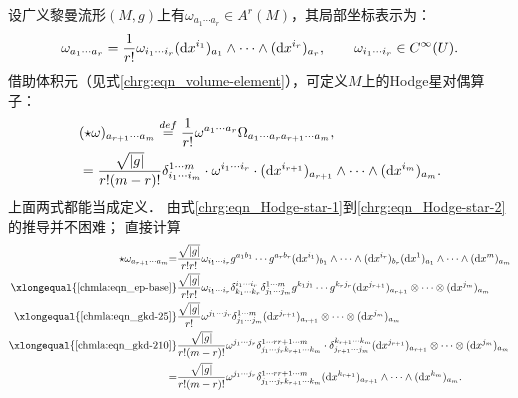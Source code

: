 设广义黎曼流形$(M,g)$上有$\omega_{a_1 \cdots a_r}\in A^r(M)$，其局部坐标表示为：
\begin{equation}
    \omega_{a_1 \cdots a_r}= \frac{1}{r!}\omega_{i_1\cdots i_r} ({\rm d}x^{i_1})_{a_1} \wedge \cdots
      \wedge({\rm d}x^{i_r})_{a_r}, \qquad \omega_{i_1\cdots i_r} \in C^\infty(U) .
\end{equation}
借助体积元（见式\eqref{chrg:eqn_volume-element}），可定义$M$上的Hodge星对偶算子：
\begin{subequations}\label{chrg:eqn_Hodge-star}
\begin{align}
    &(\star \omega) _{ a_{r+1}  \cdots a_m} \overset{def}{=} 
    \frac{1}{r!} \omega^{a_1 \cdots a_r} \Omega_{a_1 \cdots a_r a_{r+1} \cdots a_m},
      \label{chrg:eqn_Hodge-star-1} \\
    &= \frac{\sqrt{|g|}}{r! (m-r)!} \delta_{i_{1} \cdots i_m}^{1 \cdots m}
      \cdot \omega^{i_1\cdots i_r}\cdot   ({\rm d}x^{i_{r+1}})_{a_{r+1}} \wedge
     \cdots \wedge({\rm d}x^{i_m})_{a_m} . \label{chrg:eqn_Hodge-star-2}
\end{align}
\end{subequations}
上面两式都能当成定义．
由式\eqref{chrg:eqn_Hodge-star-1}到\eqref{chrg:eqn_Hodge-star-2}的推导并不困难；
直接计算
\begin{align*}
    \star \omega _{a_{r+1} \cdots a_m} {=}  &
    \frac{\sqrt{|g|}}{r! r!} \omega_{i_1\cdots i_r} g^{a_1 b_1}\cdots g^{a_r b_r}
    ({\rm d}x^{i_1})_{b_1} \wedge \cdots \wedge({\rm d}x^{i_r})_{b_r}
    ({\rm d}x^1)_{a_1} \wedge \cdots \wedge({\rm d}x^m)_{a_m} \\
    \xlongequal{\ref{chmla:eqn_ep-base}}& \frac{\sqrt{|g|}}{r! r!} \omega_{i_1\cdots i_r}
    \delta^{i_1 \cdots i_r}_{k_1 \cdots k_r}  \delta_{j_1 \cdots j_m}^{1 \cdots m}
     g^{k_1 j_1}\cdots g^{k_r j_r}
     ({\rm d}x^{j_{r+1}})_{a_{r+1}} \otimes \cdots \otimes ({\rm d}x^{j_m})_{a_m}  \\
     \xlongequal{\ref{chmla:eqn_gkd-25}}& \frac{\sqrt{|g|}}{r!} \omega^{j_1\cdots j_r}
      \delta_{j_1 \cdots j_m}^{1 \cdots m}
     ({\rm d}x^{j_{r+1}})_{a_{r+1}} \otimes \cdots \otimes ({\rm d}x^{j_m})_{a_m}  \\
     \xlongequal{\ref{chmla:eqn_gkd-210}}&
     \frac{\sqrt{|g|}}{r! (m-r)!} \omega^{j_1\cdots j_r}
     \delta_{j_1 \cdots j_r k_{r+1}\cdots k_m}^{1 \cdots r {r+1}\cdots m}
     \cdot \delta^{k_{r+1} \cdots k_m}_{j_{r+1} \cdots j_m}
     ({\rm d}x^{j_{r+1}})_{a_{r+1}} \otimes \cdots \otimes ({\rm d}x^{j_m})_{a_m}  \\
     =&\frac{\sqrt{|g|}}{r! (m-r)!} \omega^{j_1\cdots j_r}
     \delta_{j_1 \cdots j_r k_{r+1}\cdots k_m}^{1 \cdots r {r+1}\cdots m}
     ({\rm d}x^{k_{r+1}})_{a_{r+1}} \wedge \cdots \wedge ({\rm d}x^{k_m})_{a_m}  .
\end{align*}  %

